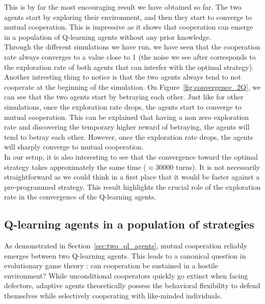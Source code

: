 \documentclass[11pt, a4paper]{article}
\begin{document}
This is by far the most encouraging result we have obtained so far. The two agents start by exploring their environment, and then they start to converge to mutual cooperation. This is impressive as it shows that cooperation can emerge in a population of Q-learning agents without any prior knowledge. \\

Through the different simulations we have run, we have seen that the cooperation rate always converges to a value close to 1 (the noise we see after corresponds to the exploration rate of both agents that can interfer with the optimal strategy). \\

Another intresting thing to notice is that the two agents always tend to not cooperate at the beginning of the simulation. On Figure~\ref{fig:convergence_2Q}, we can see that the two agents start by betraying each other. Just like for other simulations, once the exploration rate drops, the agents start to converge to mutual cooperation. This can be explained that having a non zero exploration rate and discovering the temporary higher reward of betraying, the agents will tend to betray each other. However, once the exploration rate drops, the agents will sharply converge to mutual cooperation. \\

In our setup, it is also interesting to see that the convergence toward the optimal strategy takes approximately the same time ($\approx 30000$ turns). It is not necessarily straightforward as we could think in a first place that it would be faster against a pre-programmed strategy. This result highlights the crucial role of the exploration rate in the convergence of the Q-learning agents. \\

\subsection{Q-learning agents in a population of strategies}
\label{sec:ql_agents_population}

As demonstrated in Section~\ref{sec:two_ql_agents}, mutual cooperation reliably emerges between two Q-learning agents. This leads to a canonical question in evolutionary game theory \citep{axelrod1984}: can cooperation be sustained in a hostile environment? While unconditional cooperators quickly go extinct when facing defectors, adaptive agents theoretically possess the behavioral flexibility to defend themselves while selectively cooperating with like-minded individuals. \\
\end{document}
